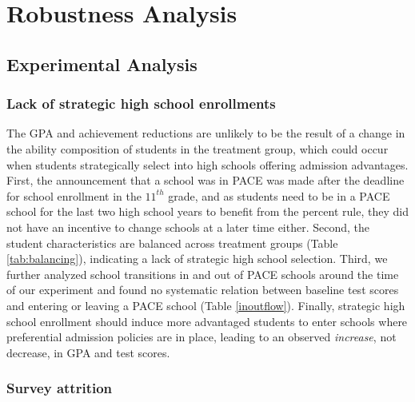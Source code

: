 
\clearpage

     \section{Robustness Analysis}\label{sec:appendixrobustness}
	\setcounter{table}{0}
	\renewcommand{\thetable}{D\arabic{table}}
	
	\setcounter{figure}{0}
	\renewcommand{\thefigure}{D\arabic{figure}}

 
\subsection{Experimental Analysis}\label{sec:appendixrobustnessexp}



\subsubsection{Lack of strategic high school enrollments}\label{sec:lackofstrat}

The GPA and achievement reductions are unlikely to be the result of a change in the ability composition of students in the treatment group, which could occur when students strategically select into high schools offering admission advantages. First, the announcement that a school was in PACE was made after the deadline for school enrollment in the $11^{th}$ grade, and as students need to be in a PACE school for the last two high school years to benefit from the percent rule, they did not have an incentive to change schools at a later time either. Second, the student characteristics are balanced across treatment groups (Table \ref{tab:balancing}), indicating a lack of strategic high school selection. Third, we further analyzed school transitions in and out of PACE schools around the time of our experiment and found no systematic relation between baseline test scores and entering or leaving a PACE school (Table \ref{inoutflow}). Finally, strategic high school enrollment should induce more advantaged students to enter schools where preferential admission policies are in place, leading to an observed {\itshape increase}, not decrease, in GPA and test scores.




\subsubsection{Survey attrition}\label{label:surveyatt}

